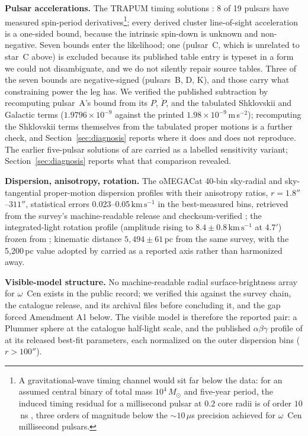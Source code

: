 \documentclass[11pt]{article}
\newcommand{\msun}{\ensuremath{M_\odot}}
\newcommand{\ocen}{$\omega$~Cen}
\newcommand{\kms}{\ensuremath{\mathrm{km\,s^{-1}}}}
\begin{document}
\textbf{Pulsar accelerations.} The TRAPUM timing solutions \citep{ColomiBernadich2026}: 8 of 19 pulsars have measured spin-period derivatives\footnote{A gravitational-wave timing channel would sit far below the data: for an assumed central binary of total mass $10^{4}\,\msun$ and five-year period, the induced timing residual for a millisecond pulsar at $0.2$ core radii is of order $10$\,ns \citep{Qi2026}, three orders of magnitude below the $\sim 10\,\mu$s precision achieved for \ocen{} millisecond pulsars.}; every derived cluster line-of-sight acceleration is a one-sided bound, because the intrinsic spin-down is unknown and non-negative. Seven bounds enter the likelihood; one (pulsar~C, which is unrelated to star~C above) is excluded because its published table entry is typeset in a form we could not disambiguate, and we do not silently repair source tables. Three of the seven bounds are negative-signed (pulsars~B, D, K), and those carry what constraining power the leg has. We verified the published subtraction by recomputing pulsar~A's bound from its $P$, $\dot{P}$, and the tabulated Shklovskii and Galactic terms ($1.9796\times10^{-9}$ against the printed $1.98\times10^{-9}$\,m\,s$^{-2}$); recomputing the Shklovskii terms themselves from the tabulated proper motions is a further check, and Section~\ref{sec:diagnosis} reports where it does and does not reproduce. The earlier five-pulsar solutions of \citet{Dai2023} are carried as a labelled sensitivity variant; Section~\ref{sec:diagnosis} reports what that comparison revealed.

\textbf{Dispersion, anisotropy, rotation.} The oMEGACat 40-bin sky-radial and sky-tangential proper-motion dispersion profiles with their anisotropy ratios, $r = 1.8''$--$311''$, statistical errors 0.023--0.05\,\kms{} in the best-measured bins, retrieved from the survey's machine-readable release and checksum-verified \citep{oMEGACatVI2025}; the integrated-light rotation profile (amplitude rising to $8.4 \pm 0.8$\,\kms{} at $4.7'$) frozen from \citet{Haberle2026LVM}; kinematic distance $5{,}494 \pm 61$\,pc from the same survey, with the 5{,}200\,pc value adopted by \citet{BanaresHernandez2025} carried as a reported axis rather than harmonized away.

\textbf{Visible-model structure.} No machine-readable radial surface-brightness array for \ocen{} exists in the public record; we verified this against the survey chain, the \citet{BaumgardtHilker2018} catalogue release, and its archival files before concluding it, and the gap forced Amendment A1 below. The visible model is therefore the reported pair: a Plummer sphere at the catalogue half-light scale, and the published $\alpha\beta\gamma$ profile of \citet{BanaresHernandez2025} at its released best-fit parameters, each normalized on the outer dispersion bins ($r > 100''$).
\end{document}
